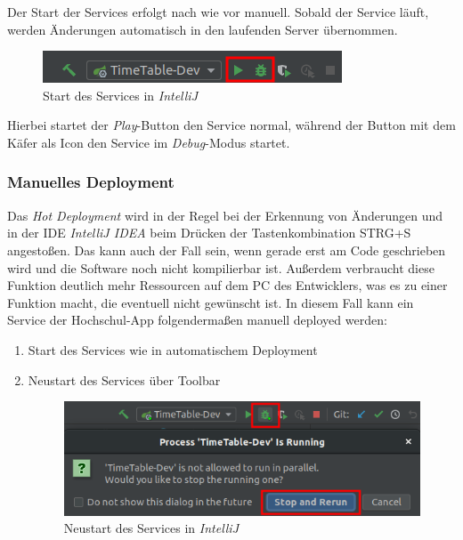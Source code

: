 Der Start der Services erfolgt nach wie vor manuell. Sobald der Service läuft, werden Änderungen automatisch in den laufenden Server übernommen.

\begin{figure}[H]
\centering
\includegraphics[width=\pictureWidth cm]{Bilder/Kapitel_4/start.png}
\caption{Start des Services in \textit{IntelliJ}\label{fig:start}}
\end{figure}

Hierbei startet der \textit{Play}-Button den Service normal, während der Button mit dem Käfer als Icon den Service im \textit{Debug}-Modus startet.

\subsubsection*{Manuelles Deployment}

Das \textit{Hot Deployment} wird in der Regel bei der Erkennung von Änderungen und in der \ac{IDE} \textit{IntelliJ IDEA} beim Drücken der Tastenkombination \textsc{STRG+S} angestoßen. Das kann auch der Fall sein, wenn gerade erst am Code geschrieben wird und die Software noch nicht kompilierbar ist. Außerdem verbraucht diese Funktion deutlich mehr Ressourcen auf dem \ac{PC} des Entwicklers, was es zu einer Funktion macht, die eventuell nicht gewünscht ist. In diesem Fall kann ein Service der Hochschul-\ac{App} folgendermaßen manuell deployed werden:

\begin{enumerate}

\item Start des Services wie in automatischem Deployment
\item Neustart des Services über Toolbar

\begin{figure}[H]
\centering
\includegraphics[width=\pictureWidth cm]{Bilder/Kapitel_4/rerun.png}
\caption{Neustart des Services in \textit{IntelliJ}\label{fig:rerun}}
\end{figure}

\end{enumerate}



